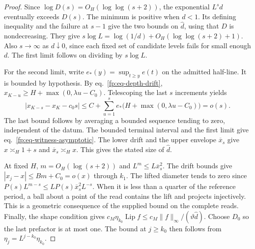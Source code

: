 \documentclass[11pt,letterpaper,reqno]{amsart}
\numberwithin{equation}{section}
\renewcommand{\eqref}[1]{\textup{eq.~\ref{#1}}}
\theoremstyle{definition}
\theoremstyle{remark}
\begin{document}
\begin{proof}
Since \(\log D(s)=O_H(\log\log(s+2))\), the exponential
\(L^s d\) eventually exceeds \(D(s)\). The minimum is positive
when \(d<1\). Its defining inequality and the failure at \(s-1\)
give the two bounds on \(\widehat d\), using that \(D\) is
nondecreasing. They give
\(s\log L=\log(1/d)+O_H(\log\log(s+2)+1)\).
Also \(s\to\infty\) as \(d\downarrow0\), since each fixed set of
candidate levels fails for small enough \(d\). The first limit
follows on dividing by \(s\log L\).

For the second limit, write \(e_*(y)=\sup_{t\ge y}e(t)\) on the
admitted half-line. It is bounded by hypothesis.
By \eqref{fp:eq-depth-drift},
\(x_{K-u}\ge H+\max(0,\lambda u-C_0)\).
Telescoping the last \(s\) increments yields
\[
 |x_{K-s}-x_K-c_0s|
 \le C+\sum_{u=1}^s e_*\bigl(H+\max(0,\lambda u-C_0)\bigr)=o(s).
\]
The last bound follows by averaging a bounded sequence tending to
zero, independent of the datum. The bounded terminal interval
and the first limit give \eqref{fp:eq-witness-asymptotic}.
The lower drift and the upper envelope \(\overline x_s\) give
\(x\asymp_H 1+s\) and \(\overline x_s\asymp_H x\).
This gives the stated size of \(\widehat d\).

At fixed \(H\), \(m=O_H(\log(s+2))\) and \(L^m\le L\overline x_s^2\).
The drift bounds give \(|x_j-x|\le Bm+C_0=o(x)\) through \(k_1\).
The lifted diameter tends to zero since
\(P(s)L^{m-s}\le L P(s)\overline x_s^2L^{-s}\).
When it is less than a quarter of the reference period, a ball
about a point of the read contains the lift and projects
injectively. This is a geometric consequence of the supplied
bound on the complete reads. Finally, the shape condition gives
\(c_M\eta_{k_0}\operatorname{Lip} f
 \le c_M\|f\|_\infty/(\vartheta\widehat d)\).
Choose \(D_0\) so the last prefactor is at most one.
The bound at \(j\ge k_0\) then follows from
\(\eta_j=L^{j-k_0}\eta_{k_0}\).
\end{proof}
\end{document}
